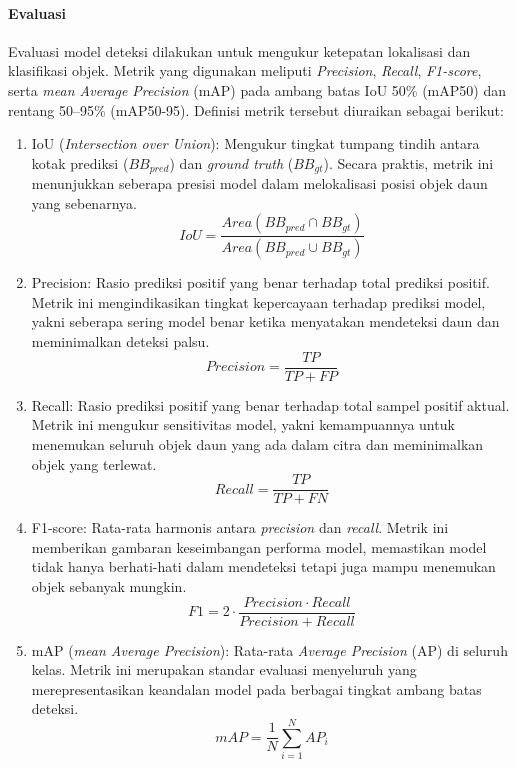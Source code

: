 \paragraph{Evaluasi}
Evaluasi model deteksi dilakukan untuk mengukur ketepatan lokalisasi dan klasifikasi objek. Metrik yang digunakan meliputi \textit{Precision}, \textit{Recall}, \textit{F1-score}, serta \textit{mean Average Precision} (mAP) pada ambang batas IoU 50\% (mAP50) dan rentang 50--95\% (mAP50-95). Definisi metrik tersebut diuraikan sebagai berikut:

\begin{enumerate}[nosep]
    \item IoU (\textit{Intersection over Union}): Mengukur tingkat tumpang tindih antara kotak prediksi ($BB_{pred}$) dan \textit{ground truth} ($BB_{gt}$). Secara praktis, metrik ini menunjukkan seberapa presisi model dalam melokalisasi posisi objek daun yang sebenarnya.
    \[IoU = \frac{Area(BB_{pred} \cap BB_{gt})}{Area(BB_{pred} \cup BB_{gt})}\]

    \item Precision: Rasio prediksi positif yang benar terhadap total prediksi positif. Metrik ini mengindikasikan tingkat kepercayaan terhadap prediksi model, yakni seberapa sering model benar ketika menyatakan mendeteksi daun dan meminimalkan deteksi palsu.
    \[Precision = \frac{TP}{TP + FP}\]

    \item Recall: Rasio prediksi positif yang benar terhadap total sampel positif aktual. Metrik ini mengukur sensitivitas model, yakni kemampuannya untuk menemukan seluruh objek daun yang ada dalam citra dan meminimalkan objek yang terlewat.
    \[Recall = \frac{TP}{TP + FN}\]

    \item F1-score: Rata-rata harmonis antara \textit{precision} dan \textit{recall}. Metrik ini memberikan gambaran keseimbangan performa model, memastikan model tidak hanya berhati-hati dalam mendeteksi tetapi juga mampu menemukan objek sebanyak mungkin.
    \[F1 = 2 \cdot \frac{Precision \cdot Recall}{Precision + Recall}\]

    \item mAP (\textit{mean Average Precision}): Rata-rata \textit{Average Precision} (AP) di seluruh kelas. Metrik ini merupakan standar evaluasi menyeluruh yang merepresentasikan keandalan model pada berbagai tingkat ambang batas deteksi.
    \[mAP = \frac{1}{N} \sum_{i=1}^{N} AP_i\]
\end{enumerate}

